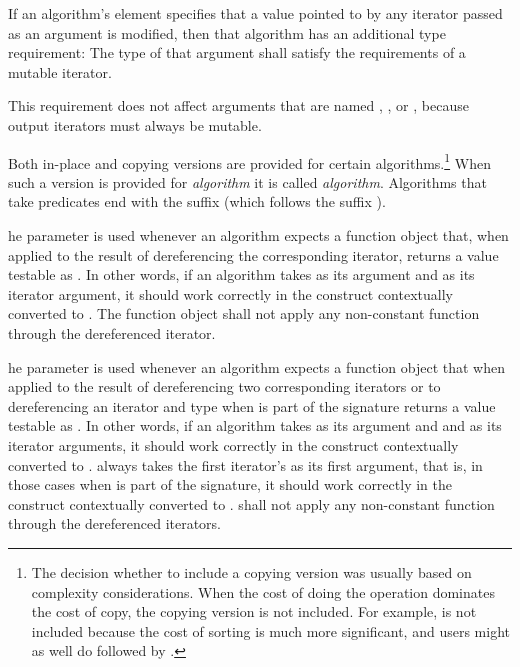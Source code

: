\pnum
If an algorithm's
\effects
element specifies that a value pointed to by any iterator passed
as an argument is modified, then that algorithm has an additional
type requirement:
The type of that argument shall satisfy the requirements
of a mutable iterator.
\begin{note}
This requirement does not affect arguments that are named
,
,
or
,
because output iterators must always be mutable.
\end{note}

\pnum
Both in-place and copying versions are provided for certain
algorithms.\footnote{The decision whether to include a copying version was
usually based on complexity considerations. When the cost of doing the operation
dominates the cost of copy, the copying version is not included. For example,
 is not included because the cost of sorting is much more
significant, and users might as well do  followed by .}
When such a version is provided for \textit{algorithm} it is called
\textit{algorithm}. Algorithms that take predicates end with the
suffix  (which follows the suffix ).

\pnum
{}he
parameter is used whenever an algorithm expects a function object
that, when applied to the result
of dereferencing the corresponding iterator, returns a value testable as
.
In other words, if an algorithm
takes
as its argument and 
as its iterator argument, it should work correctly in the
construct
 contextually converted to .
The function object
shall not apply any non-constant
function through the dereferenced iterator.

\pnum
{}he
parameter is used whenever an algorithm expects a function object that when applied to
the result of dereferencing two corresponding iterators or to dereferencing an
iterator and type
when
is part of the signature returns a value testable as
.
In other words, if an algorithm takes
as its argument and  and  as
its iterator arguments, it should work correctly in
the construct
 contextually converted to .
always takes the first
iterator's 
as its first argument, that is, in those cases when
is part of the signature, it should work
correctly in the
construct  contextually converted to .
 shall not
apply any non-constant function through the dereferenced iterators.

